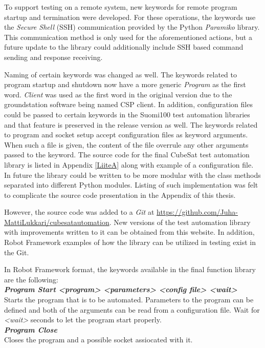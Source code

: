 \documentclass[english,12pt,a4paper,pdftex,elec,utf8]{aaltothesis}
\begin{document}
To support testing on a remote system, new keywords for remote program startup and termination were developed. For these operations, the keywords use the \textit{Secure Shell} (SSH) communication provided by the Python \textit{Paramiko} library. This communication method is only used for the aforementioned actions, but a future update to the library could additionally include SSH based command sending and response receiving. \par 
Naming of certain keywords was changed as well. The keywords related to program startup and shutdown now have a more generic \textit{Program} as the first word. \textit{Client} was used as the first word in the original version due to the groundstation software being named CSP client. In addition, configuration files could be passed to certain keywords in the Suomi100 test automation libraries and that feature is preserved in the release version as well. The keywords related to program and socket setup accept configuration files as keyword arguments. When such a file is given, the content of the file overrule any other arguments passed to the keyword. The source code for the final CubeSat test automation library is listed in Appendix \ref{LiiteA} along with example of a configuration file. In future the library could be written to be more modular with the class methods separated into different Python modules. Listing of such implementation was felt to complicate the source code presentation in the Appendix of this thesis.\par
However, the source code was added to a \textit{Git} at \url{https://github.com/Juha-MattiLukkari/cubesatautomation}. New versions of the test automation library with improvements written to it can be obtained from this website. In addition, Robot Framework examples of how the library can be utilized in testing exist in the Git. \par
In Robot Framework format, the keywords available in the final function library are the following:\\
\textit{\textbf{Program Start  <program> <parameters> <config file> <wait>}}\\
Starts the program that is to be automated. Parameters to the program can be defined and both of the arguments can be read from a configuration file. Wait for \textit{<wait>} seconds to let the program start properly.\\
\textit{\textbf{Program Close}}\\
Closes the program and a possible socket assiocated with it.\\
\end{document}
